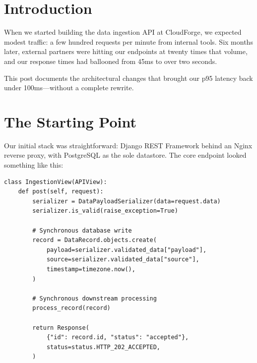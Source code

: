 \documentclass[
    language=english,
    doctype=blog-post,
    institution=none,
]{../../omnilatex}
\begin{document}
\maketitle

\begin{abstract}
    Designing a REST API that can handle a million requests per day requires more
    than just choosing the right HTTP verbs. In this post, I share the architecture
    decisions, performance pitfalls, and practical lessons our team learned while
    scaling a Django-based API from prototype to production.
\end{abstract}

\section{Introduction}

When we started building the data ingestion API at CloudForge, we expected modest
traffic: a few hundred requests per minute from internal tools. Six months later,
external partners were hitting our endpoints at twenty times that volume, and our
response times had ballooned from 45ms to over two seconds.

This post documents the architectural changes that brought our p95 latency back
under 100ms---without a complete rewrite.

\section{The Starting Point}

Our initial stack was straightforward: Django REST Framework behind an Nginx
reverse proxy, with PostgreSQL as the sole datastore. The core endpoint looked
something like this:

\begin{lstlisting}[caption={Original endpoint handler}]
class IngestionView(APIView):
    def post(self, request):
        serializer = DataPayloadSerializer(data=request.data)
        serializer.is_valid(raise_exception=True)

        # Synchronous database write
        record = DataRecord.objects.create(
            payload=serializer.validated_data["payload"],
            source=serializer.validated_data["source"],
            timestamp=timezone.now(),
        )

        # Synchronous downstream processing
        process_record(record)

        return Response(
            {"id": record.id, "status": "accepted"},
            status=status.HTTP_202_ACCEPTED,
        )
\end{lstlisting}
\end{document}
